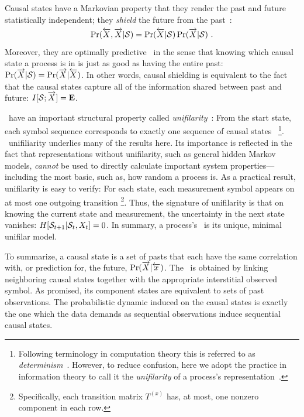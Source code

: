 Causal states have a Markovian property that they render the past and future
statistically independent; they \emph{shield} the future from the past~\cite{Crut98d}:
\begin{equation}
\Pr(\smash{\overleftarrow {{X}}},\smash{\overrightarrow{{X}}}|\mathcal{S})
  = \Pr(\smash{\overleftarrow {{X}}}|\mathcal{S}) \Pr(\smash{\overrightarrow{{X}}}|\mathcal{S}) ~.
\label{shield}
\end{equation}
Moreover, they are optimally predictive~\cite{Crut88a} in the sense that
knowing which causal state a process is in is just as good as having the
entire past: $\Pr(\smash{\overrightarrow{{X}}}|\mathcal{S}) = \Pr(\smash{\overrightarrow{{X}}}|\smash{\overleftarrow {{X}}})$. In other
words, causal shielding is equivalent to the fact~\cite{Crut98d} that the
causal states capture all of the information shared between past and future:
$I[\mathcal{S};\smash{\overrightarrow{{X}}}] = {\bf E}$.

\EMs\ have an important structural property called
\emph{unifilarity}~\cite{Crut88a,Shal98a}: From the start state, each symbol 
sequence corresponds to exactly one sequence of causal states~%
\footnote{Following terminology in computation theory 
this is referred to as \emph{determinism}~\cite{Hopc79}. However, to reduce 
confusion, here we adopt the practice in information theory to call it the 
\emph{unifilarity} of a process's representation~\cite{Ephr02a}.}.
\EM\ unifiliarity underlies many of the results here. Its importance is
reflected in the fact that representations without unifilarity, such as general
hidden Markov models, \emph{cannot} be used to directly calculate important
system properties---including the most basic, such as, how random a process is.
As a practical result, unifilarity is easy to verify: For each state, each
 measurement symbol appears on at most one outgoing transition
\footnote{Specifically, each transition matrix $T^{(x)}$ has, at most, one
nonzero component in each row.}. Thus, the signature of unifilarity is that on 
knowing the current state and measurement, the uncertainty in the next state
 vanishes: $H[\mathcal{S}_{t+1}|\mathcal{S}_t,{X}_t] = 0$.
In summary, a process's \eM\ is its unique, minimal unifilar model. 

To summarize, a causal state is a set of pasts that each have the same correlation with, or prediction for, the future, $\Pr(\smash{\overrightarrow{{X}}} | \smash{\overleftarrow {{x}}})$. The \eM\ is obtained by linking neighboring causal states together with the appropriate interstitial observed symbol. As promised, its component states are equivalent to sets of past observations. The probabilistic dynamic induced on the causal states is exactly the one which the data demands as sequential observations induce sequential causal states.

